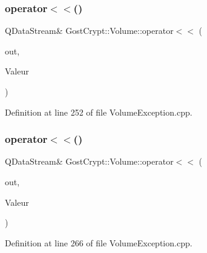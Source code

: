 \subsubsection{\texorpdfstring{operator$<$$<$()}{operator<<()}\hspace{0.1cm}{\footnotesize\ttfamily [18/19]}}
{\footnotesize\ttfamily Q\+Data\+Stream\& Gost\+Crypt\+::\+Volume\+::operator$<$$<$ (\begin{DoxyParamCaption}\item[{Q\+Data\+Stream \&}]{out,  }\item[{const \hyperlink{class_gost_crypt_1_1_volume_1_1_data_not_mutable}{Gost\+Crypt\+::\+Volume\+::\+Data\+Not\+Mutable} \&}]{Valeur }\end{DoxyParamCaption})}



Definition at line 252 of file Volume\+Exception.\+cpp.

\mbox{\label{namespace_gost_crypt_1_1_volume_ae890b9a8fa6dd352165c3128e36d6e49}} 
\subsubsection{\texorpdfstring{operator$<$$<$()}{operator<<()}\hspace{0.1cm}{\footnotesize\ttfamily [19/19]}}
{\footnotesize\ttfamily Q\+Data\+Stream\& Gost\+Crypt\+::\+Volume\+::operator$<$$<$ (\begin{DoxyParamCaption}\item[{Q\+Data\+Stream \&}]{out,  }\item[{const \hyperlink{class_gost_crypt_1_1_volume_1_1_incorrect_cipher_data_length}{Gost\+Crypt\+::\+Volume\+::\+Incorrect\+Cipher\+Data\+Length} \&}]{Valeur }\end{DoxyParamCaption})}



Definition at line 266 of file Volume\+Exception.\+cpp.

\mbox{\label{namespace_gost_crypt_1_1_volume_ab2b8e613e6ffb8e0177bafa587bf70ae}} 
